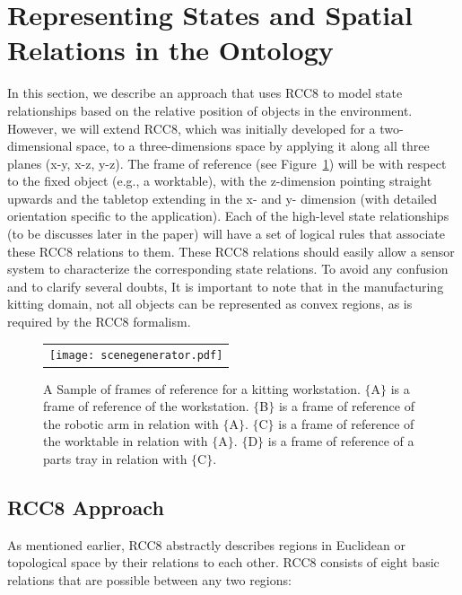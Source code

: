\documentclass[preprint,12pt]{elsarticle}
\begin{document}
\section{Representing States and Spatial Relations in the Ontology}\label{S:section2}
In this section, we describe an approach that uses RCC8 to model state relationships based on the relative position of objects in the environment. However, we will extend RCC8, which was initially developed for a two-dimensional space, to a three-dimensions space by applying it along all three planes (x-y, x-z, y-z). The frame of reference (see Figure~\ref{fig:reference_frame}) will be with respect to the fixed object (e.g., a worktable), with the z-dimension pointing straight upwards and the tabletop extending in the x- and y- dimension (with detailed orientation specific to the application).  Each of the high-level state relationships (to be discusses later in the paper) will have a set of logical rules that associate these RCC8 relations to them. These RCC8 relations should easily allow a sensor system to characterize the corresponding state relations. To avoid any confusion and to clarify several doubts, It is important to note that in the manufacturing kitting domain, not all objects can be represented as convex regions, as is required by the RCC8 formalism.

\begin{figure}[h!t!]
\begin{center}
\begin{tabular}{c}
\texttt{[image: scenegenerator.pdf]}
\end{tabular}
\end{center}
\caption{A Sample of frames of reference for a kitting workstation. $\{$A$\}$ is a frame of reference of the workstation.  $\{$B$\}$ is a frame of reference of the robotic arm in relation with $\{$A$\}$. $\{$C$\}$ is a frame of reference of the worktable in relation with $\{$A$\}$.  $\{$D$\}$ is a frame of reference of a parts tray in relation with $\{$C$\}$. 
}
\label{fig:reference_frame}
\end{figure}

\subsection{RCC8 Approach}
As mentioned earlier, RCC8 abstractly describes regions in Euclidean or topological space by their relations to each other. RCC8 consists of eight basic relations that are possible between any two regions:
\end{document}
